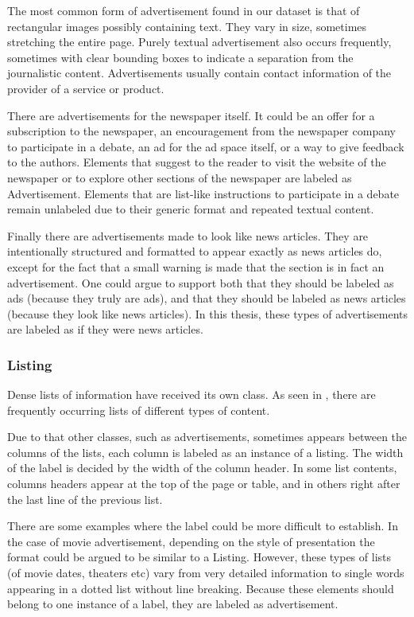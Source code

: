 \documentclass[oneside, english, bibtex]{kththesis}
\begin{document}
The most common form of advertisement found in our dataset is that of rectangular images possibly containing text.
They vary in size, sometimes stretching the entire page.
Purely textual advertisement also occurs frequently, sometimes with clear bounding boxes to indicate a separation from the journalistic content.
Advertisements usually contain contact information of the provider of a service or product.

There are advertisements for the newspaper itself.
It could be an offer for a subscription to the newspaper,
an encouragement from the newspaper company to participate in a debate, an ad for the ad space itself,
or a way to give feedback to the authors. Elements that suggest to the reader to visit the website of the newspaper
or to explore other sections of the newspaper are labeled as Advertisement.
Elements that are list-like instructions to participate in a debate remain unlabeled due to their generic format and repeated textual content.

Finally there are advertisements made to look like news articles.
They are intentionally structured and formatted to appear exactly as news articles do,
except for the fact that a small warning is made that the section is in fact an advertisement.
One could argue to support both that they should be labeled as ads (because they truly are ads), and that they should be labeled as news articles (because they look like news articles).
In this thesis, these types of advertisements are labeled as if they were news articles.

\subsubsection{Listing}

Dense lists of information have received its own class. As seen in ,
there are frequently occurring lists of different types of content.

Due to that other classes, such as advertisements, sometimes appears between the columns of the lists, each column is labeled as an instance of a listing.
The width of the label is decided by the width of the column header. In some list contents, columns headers appear at the top of the page or table,
and in others right after the last line of the previous list.

There are some examples where the label could be more difficult to establish.
In the case of movie advertisement, depending on the style of presentation the format could be argued to be similar to a Listing.
However, these types of lists (of movie dates, theaters etc) vary from very detailed information to single words appearing in a dotted list without line breaking.
Because these elements should belong to one instance of a label, they are labeled as advertisement.
\end{document}
